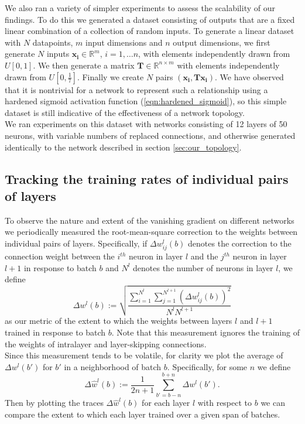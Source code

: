 \documentclass{article}
\newcommand{\mtx}[1]{\bm{#1}}
\newcommand{\npar}{\\\indent}
\begin{document}
We also ran a variety of simpler experiments to assess the scalability of our findings. To do this we generated a dataset consisting of outputs that are a fixed linear combination of a collection of random inputs. To generate a linear dataset with $N$ datapoints, $m$ input dimensions and $n$ output dimensions, we first generate $N$ inputs $\mtx{x_i}\in \mathbb{R}^m$, $i=1,\hdots n$, with elements independently drawn from $U[0, 1]$. We then generate a matrix $\mtx{T}\in \mathbb{R}^{n\times m}$ with elements independently drawn from $U[0, \frac{1}{7}]$. Finally we create $N$ pairs $(\mtx{x_i}, \mtx{T}\mtx{x_i})$. We have observed that it is nontrivial for a network to represent such a relationship using a hardened sigmoid activation function (\ref{eqn:hardened_sigmoid}), so this simple dataset is still indicative of the effectiveness of a network topology.
\npar
We ran experiments on this dataset with networks consisting of 12 layers of 50 neurons, with variable numbers of replaced connections, and otherwise generated identically to the network described in section \ref{sec:our_topology}.

\subsection{Tracking the training rates of individual pairs of layers}

To observe the nature and extent of the vanishing gradient on different networks we periodically measured the root-mean-square correction to the weights between individual pairs of layers. Specifically, if $\Delta w_{ij}^l(b)$ denotes the correction to the connection weight between the $i^{th}$ neuron in layer $l$ and the $j^{th}$ neuron in layer $l+1$ in response to batch $b$ and $N^l$ denotes the number of neurons in layer $l$, we define
\begin{equation}
\label{eqn:rms_correction}
\Delta w^l(b):=\sqrt{\frac{\sum_{i=1}^{N^l}\sum_{j=1}^{N^{l+1}}(\Delta w_{ij}^l(b))^2}{N^lN^{l+1}}}
\end{equation}
as our metric of the extent to which the weights between layers $l$ and $l+1$ trained in response to batch $b$. Note that this measurement ignores the training of the weights of intralayer and layer-skipping connections.
\npar
Since this measurement tends to be volatile, for clarity we plot the average of $\Delta w^l(b')$ for $b'$ in a neighborhood of batch $b$. Specifically, for some $n$ we define
\begin{equation}
\label{eqn:running_avg}
\Delta \hat{w}^l(b):=\frac{1}{2n+1}\sum_{b'=b-n}^{b+n}\Delta w^l(b').
\end{equation}
Then by plotting the traces $\Delta \hat{w}^l(b)$ for each layer $l$ with respect to $b$ we can compare the extent to which each layer trained over a given span of batches.
\end{document}
